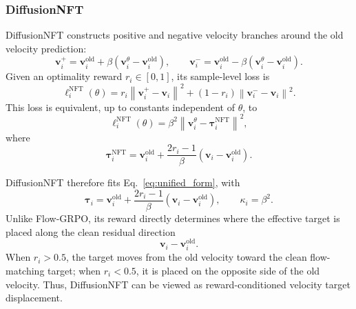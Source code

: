 

\subsubsection{DiffusionNFT}
\label{sec:diffusionnft}

DiffusionNFT constructs positive and negative velocity branches around the old
velocity prediction:
\begin{equation}
\mathbf{v}_{i}^{+}
=
\mathbf{v}_i^{\mathrm{old}}
+
\beta
\left(
\mathbf{v}_i^\theta-\mathbf{v}_i^{\mathrm{old}}
\right),
\qquad
\mathbf{v}_{i}^{-}
=
\mathbf{v}_i^{\mathrm{old}}
-
\beta
\left(
\mathbf{v}_i^\theta-\mathbf{v}_i^{\mathrm{old}}
\right).
\end{equation}
Given an optimality reward $r_i\in[0,1]$, its sample-level loss is
\begin{equation}
\ell_i^{\mathrm{NFT}}(\theta)
=
r_i
\left\|
\mathbf{v}_{i}^{+}
-
\mathbf{v}_i
\right\|^2
+
(1-r_i)
\left\|
\mathbf{v}_{i}^{-}
-
\mathbf{v}_i
\right\|^2 .
\end{equation}
This loss is equivalent, up to constants independent of $\theta$, to
\begin{equation}
\label{eq:nft_velocity_target_short}
\ell_i^{\mathrm{NFT}}(\theta)
=
\beta^2
\left\|
\mathbf{v}_i^\theta
-
\mathbf{\tau}_i^{\mathrm{NFT}}
\right\|^2,
\end{equation}
where
\begin{equation}
\label{eq:nft_pseudo_target_short}
\mathbf{\tau}_i^{\mathrm{NFT}}
=
\mathbf{v}_i^{\mathrm{old}}
+
\frac{2r_i-1}{\beta}
\left(
\mathbf{v}_i-\mathbf{v}_i^{\mathrm{old}}
\right).
\end{equation}

DiffusionNFT therefore fits Eq.~\ref{eq:unified_form}, with
\begin{equation}
\mathbf{\tau}_i
=
\mathbf{v}_i^{\mathrm{old}}
+
\frac{2r_i-1}{\beta}
\left(
\mathbf{v}_i-\mathbf{v}_i^{\mathrm{old}}
\right),
\qquad
\kappa_i
=
\beta^2 .
\end{equation}
Unlike Flow-GRPO, its reward directly determines where the effective target is placed along
the clean residual direction
\[
\mathbf{v}_i-\mathbf{v}_i^{\mathrm{old}}.
\]
When $r_i>0.5$, the target moves from the old velocity toward the clean
flow-matching target; when $r_i<0.5$, it is placed on the opposite side of the
old velocity. Thus, DiffusionNFT can be viewed as reward-conditioned velocity
target displacement.